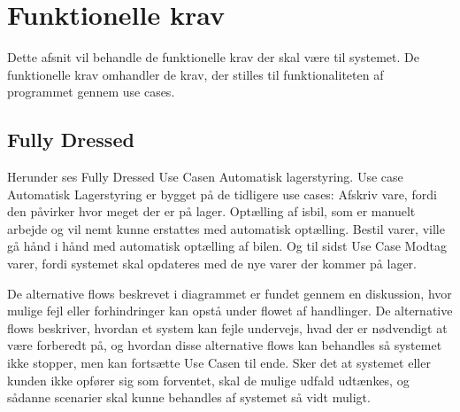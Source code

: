 \section{Funktionelle krav}\label{sec:funktionelle-krav}
Dette afsnit vil behandle de funktionelle krav der skal være til systemet. De funktionelle krav omhandler de krav, der stilles til funktionaliteten af programmet gennem use cases\cite{Larman2004}. 

\subsection{Fully Dressed} \label{fullydressed}
Herunder ses Fully Dressed Use Casen Automatisk lagerstyring. Use case Automatisk Lagerstyring er bygget på de tidligere use cases: Afskriv vare, fordi den påvirker hvor meget der er på lager. Optælling af isbil, som er manuelt arbejde og vil nemt kunne erstattes med automatisk optælling. Bestil varer, ville gå hånd i hånd med automatisk optælling af bilen. Og til sidst Use Case Modtag varer, fordi systemet skal opdateres med de nye varer der kommer på lager. 

De alternative flows beskrevet i diagrammet er fundet gennem en diskussion, hvor mulige fejl eller forhindringer kan opstå under flowet af handlinger. De alternative flows beskriver, hvordan et system kan fejle undervejs, hvad der er nødvendigt at være forberedt på, og hvordan disse alternative flows kan behandles så systemet ikke stopper, men kan fortsætte Use Casen til ende. Sker det at systemet eller kunden ikke opfører sig som forventet, skal de mulige udfald udtænkes, og sådanne scenarier skal kunne behandles af systemet så vidt muligt.

